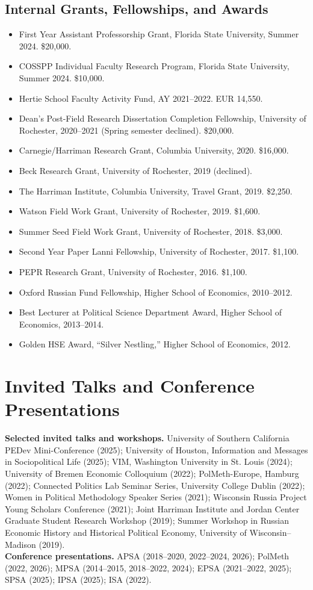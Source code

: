 \documentclass[10pt]{article}
\begin{document}
\subsection{Internal Grants, Fellowships, and Awards}
\begin{itemize}
    \item First Year Assistant Professorship Grant, Florida State University, Summer 2024. \$20,000.
    \item COSSPP Individual Faculty Research Program, Florida State University, Summer 2024. \$10,000.
    \item Hertie School Faculty Activity Fund, AY 2021--2022. EUR 14,550.
    \item Dean's Post-Field Research Dissertation Completion Fellowship, University of Rochester, 2020--2021 (Spring semester declined). \$20,000.
    \item Carnegie/Harriman Research Grant, Columbia University, 2020. \$16,000.
    \item Beck Research Grant, University of Rochester, 2019 (declined).
    \item The Harriman Institute, Columbia University, Travel Grant, 2019. \$2,250.
    \item Watson Field Work Grant, University of Rochester, 2019. \$1,600.
    \item Summer Seed Field Work Grant, University of Rochester, 2018. \$3,000.
    \item Second Year Paper Lanni Fellowship, University of Rochester, 2017. \$1,100.
    \item PEPR Research Grant, University of Rochester, 2016. \$1,100.
    \item Oxford Russian Fund Fellowship, Higher School of Economics, 2010--2012.
    \item Best Lecturer at Political Science Department Award, Higher School of Economics, 2013--2014.
    \item Golden HSE Award, ``Silver Nestling,'' Higher School of Economics, 2012.
\end{itemize}

\section{Invited Talks and Conference Presentations}
\textbf{Selected invited talks and workshops.} University of Southern California PEDev Mini-Conference (2025); University of Houston, Information and Messages in Sociopolitical Life (2025); VIM, Washington University in St. Louis (2024); University of Bremen Economic Colloquium (2022); PolMeth-Europe, Hamburg (2022); Connected Politics Lab Seminar Series, University College Dublin (2022); Women in Political Methodology Speaker Series (2021); Wisconsin Russia Project Young Scholars Conference (2021); Joint Harriman Institute and Jordan Center Graduate Student Research Workshop (2019); Summer Workshop in Russian Economic History and Historical Political Economy, University of Wisconsin--Madison (2019).\\[3pt]
\textbf{Conference presentations.} APSA (2018--2020, 2022--2024, 2026); PolMeth (2022, 2026); MPSA (2014--2015, 2018--2022, 2024); EPSA (2021--2022, 2025); SPSA (2025); IPSA (2025); ISA (2022).
\end{document}
